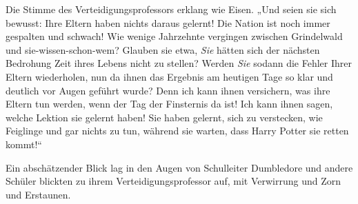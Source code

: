 Die Stimme des Verteidigungsprofessors erklang wie Eisen.
„Und seien sie sich bewusst: Ihre Eltern haben nichts daraus gelernt! Die Nation ist noch immer gespalten und schwach! Wie wenige Jahrzehnte vergingen zwischen Grindelwald und sie-wissen-schon-wem? Glauben sie etwa, \emph{Sie} hätten sich der nächsten Bedrohung Zeit ihres Lebens nicht zu stellen? Werden \emph{Sie} sodann die Fehler Ihrer Eltern wiederholen, nun da ihnen das Ergebnis am heutigen Tage so klar und deutlich vor Augen geführt wurde? Denn ich kann ihnen versichern, was ihre Eltern tun werden, wenn der Tag der Finsternis da ist! Ich kann ihnen sagen, welche Lektion sie gelernt haben! Sie haben gelernt, sich zu verstecken, wie Feiglinge und gar nichts zu tun, während sie warten, dass Harry Potter sie retten kommt!“

Ein abschätzender Blick lag in den Augen von Schulleiter Dumbledore und andere Schüler blickten zu ihrem Verteidigungsprofessor auf, mit Verwirrung und Zorn und Erstaunen.

